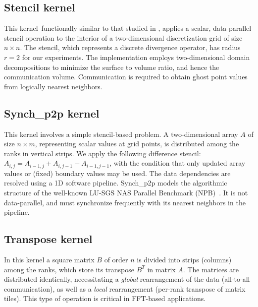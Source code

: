 \subsection{Stencil kernel}
This kernel--functionally similar to that studied in \cite{Gamell:HPDC15}, applies a 
scalar, data-parallel stencil operation to the interior of a 
two-dimensional discretization grid of size $n\times{n}$. 
The stencil, which represents a discrete divergence operator, 
has radius $r=2$ for our experiments.  
The implementation employs two-dimensional domain decompositions to minimize the surface to 
volume ratio, and hence the communication volume. 
Communication is required to obtain ghost point values from 
logically nearest neighbors. 

\subsection{Synch\_p2p kernel}
This kernel involves a simple stencil-based problem.
A two-dimensional array $A$ of size $n \times m$, representing scalar values at
grid points, is distributed among the ranks in vertical strips. 
We apply the following difference stencil:
$A_{i,j}=A_{i-1,j}+A_{i,j-1}-A_{i-1,j-1}$, 
with the condition that only updated array values or (fixed) boundary values
may be used.
The data dependencies are resolved using a 1D software pipeline.
Synch\_p2p models the algorithmic structure of the well-known
LU-SGS NAS Parallel Benchmark (NPB)~\cite{Bailey:1991:IJHPCA:NAS}.
It is not data-parallel, and must synchronize frequently with its nearest neighbors in 
the pipeline.

\subsection{Transpose kernel}
In this kernel a square matrix $B$ of order $n$ is divided
into strips (columns) among the ranks, which  store its transpose $B^T$
in matrix $A$.
The matrices are distributed identically, necessitating a \textit{global} rearrangement
of the data (all-to-all communication), as well as a \textit{local} rearrangement
(per-rank transpose of matrix tiles).
This type of operation is critical in FFT-based applications.
